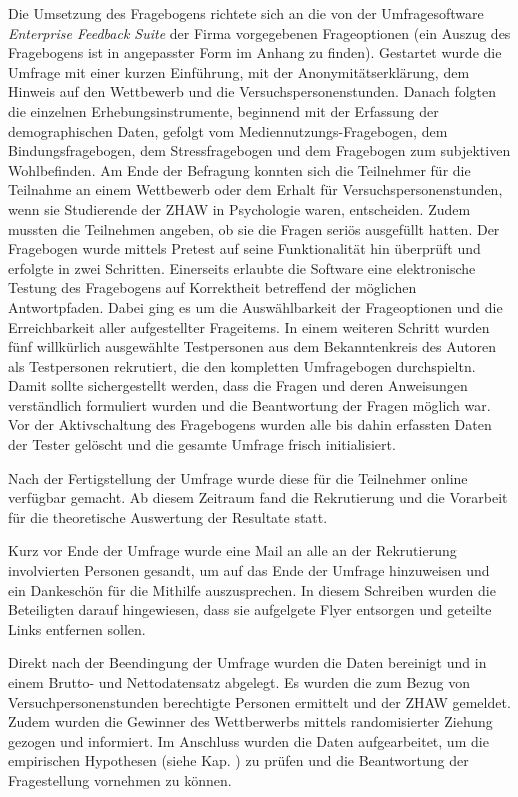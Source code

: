 Die Umsetzung des Fragebogens richtete sich an die von der Umfragesoftware \textit{Enterprise Feedback Suite} der Firma  vorgegebenen Frageoptionen (ein Auszug des Fragebogens ist in angepasster Form im Anhang  zu finden). Gestartet wurde die Umfrage mit einer kurzen Einführung, mit der Anonymitätserklärung, dem Hinweis auf den Wettbewerb und die Versuchspersonenstunden. Danach folgten die einzelnen Erhebungsinstrumente, beginnend mit der Erfassung der demographischen Daten, gefolgt vom Mediennutzungs-Fragebogen, dem Bindungsfragebogen, dem Stressfragebogen und dem Fragebogen zum subjektiven Wohlbefinden. Am Ende der Befragung konnten sich die Teilnehmer für die Teilnahme an einem Wettbewerb oder dem Erhalt für Versuchspersonenstunden, wenn sie Studierende der ZHAW in Psychologie waren, entscheiden. Zudem mussten die Teilnehmen angeben, ob sie die Fragen seriös ausgefüllt hatten. Der Fragebogen wurde mittels Pretest auf seine Funktionalität hin überprüft und erfolgte in zwei Schritten. Einerseits erlaubte die Software eine elektronische Testung des Fragebogens auf Korrektheit betreffend der möglichen Antwortpfaden. Dabei ging es um die Auswählbarkeit der Frageoptionen und die Erreichbarkeit aller aufgestellter Frageitems. In einem weiteren Schritt wurden fünf willkürlich ausgewählte Testpersonen aus dem Bekanntenkreis des Autoren als Testpersonen rekrutiert, die den kompletten Umfragebogen durchspieltn. Damit sollte sichergestellt werden, dass die Fragen und deren Anweisungen verständlich formuliert wurden und die Beantwortung der Fragen möglich war. Vor der Aktivschaltung des Fragebogens wurden alle bis dahin erfassten Daten der Tester gelöscht und die gesamte Umfrage frisch initialisiert.

Nach der Fertigstellung der Umfrage wurde diese für die Teilnehmer online verfügbar gemacht. Ab diesem Zeitraum fand die Rekrutierung und die Vorarbeit für die theoretische Auswertung der Resultate statt.

Kurz vor Ende der Umfrage wurde eine Mail an alle an der Rekrutierung involvierten Personen gesandt, um auf das Ende der Umfrage hinzuweisen und ein Dankeschön für die Mithilfe auszusprechen. In diesem Schreiben wurden die Beteiligten darauf hingewiesen, dass sie aufgelgete Flyer entsorgen und geteilte Links entfernen sollen. 

Direkt  nach der Beendingung der Umfrage wurden die Daten bereinigt und in einem Brutto- und Nettodatensatz abgelegt. Es wurden die zum Bezug von Versuchpersonenstunden berechtigte Personen ermittelt und der ZHAW gemeldet. Zudem wurden die Gewinner des Wettberwerbs mittels randomisierter Ziehung gezogen und informiert. Im Anschluss wurden die Daten aufgearbeitet, um die empirischen Hypothesen (siehe Kap. ) zu prüfen und die Beantwortung der Fragestellung vornehmen zu können.

